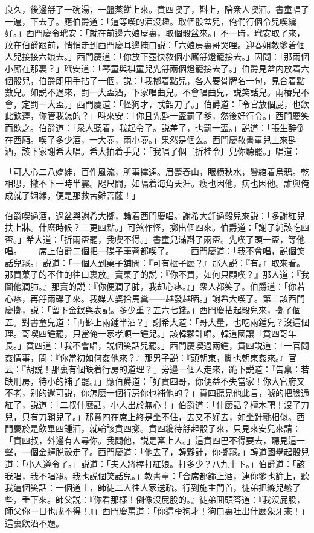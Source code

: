 良久，後邊㧱了一碗湯，一盤蒸餅上來。賁四喫了，斟上，陪衆人喫酒。書童唱了一遍，下去了。應伯爵道：「這等喫的酒沒趣。取個骰盆兒，俺們行個令兒喫纔好。」西門慶令玳安：「就在前邊六娘屋裏，取個骰盆來。」不一時，玳安取了來，放在伯爵跟前，悄悄走到西門慶耳邊掩口説：「六娘房裏哥哭哩。迎春姐教爹着個人兒接接六娘去。」西門慶道：「你放下壺快敎個小廝㧱燈籠接去。」因問：「那兩個小廝在那裏？」玳安道：「琴童與棋童兒先㧱兩個燈籠接去了。」伯爵見盆内放着六個骰兒，伯爵即用手拈了一個，説：「我擲着點兒，各人要骨牌名一句，見合着點數兒。如説不過來，罰一大盃酒，下家唱曲兒。不會唱曲兒，説笑話兒。兩樁兒不會，定罰一大盃。」西門慶道：「怪狗才，忒韶刀了。」伯爵道：「令官放個屁，也欽此欽遵，你管我怎的？」呌來安：「你且先斟一盃罰了爹，然後好行令。」西門慶笑而飲之。伯爵道：「衆人聽着，我起令了。説差了，也罰一盃。」説道：「張生醉倒在西廂。喫了多少酒，一大壺，兩小壺。」果然是個么。西門慶敎書童兒上來斟酒，該下家謝希大唱。希大拍着手兒：「我唱了個〔折桂令〕兒你聽罷。」唱道：

\begin{myquote}
「可人心二八嬌娃，百件風流，所事撑達。眉蹙春山，眼横秋水，鬢綰着烏鴉。乾相思，撇不下一時半霎。咫尺間，如隔着海角天涯。瘦也因他，病也因他。誰與俺成就了姻緣，便是那救苦難菩薩！」
\end{myquote}

伯爵喫過酒，過盆與謝希大擲，輪着西門慶唱。謝希大㧱過骰兒來説：「多謝紅兒扶上牀。什麽時候？三更四點。」可煞作怪，擲出個四來。伯爵道：「謝子純該吃四盃。」希大道：「折兩盃罷，我喫不得。」書童兒滿斟了兩盃。先喫了頭一盃，等他唱。——席上伯爵二個把一碟子荸薺都喫了。——西門慶道：「我不會唱，説個笑話兒罷。」説道：「一個人到菓子舖問：『可有榧子麽？』那人説：『有。』取來看。那買菓子的不住的往口裏放。賣菓子的説：『你不買，如何只顧喫？』那人道：『我圖他潤肺。』那賣的説：『你便潤了肺，我却心疼。』」衆人都笑了。伯爵道：「你若心疼，再㧱兩碟子來。我媒人婆拾馬糞——越發越晒。」謝希大喫了。第三該西門慶擲，説：「留下金釵與表記。多少重？五六七錢。」西門慶拈起骰兒來，擲了個五。對書童兒道：「再斟上兩鍾半酒？」謝希大道：「哥大量，也吃兩鍾兒？沒這個理。哥喫四鍾罷，只當俺一家孝順一鍾兒。」該韓夥計唱。韓道國讓「賁四哥年長。」賁四道：「我不會唱，説個笑話兒罷。」西門慶喫過兩鍾，賁四説道：「一官問姦情事，問：『你當初如何姦他來？』那男子説：『頭朝東，脚也朝東姦來。』官云：『胡説！那裏有個缺着行房的道理？』旁邊一個人走來，跪下説道：『告禀：若缺刑房，待小的補了罷。』」應伯爵道：「好賁四哥，你便益不失當家！你大官府又不老，别的還可説，你怎麽一個行房你也補他的？」賁四聽見他此言，唬的把臉通紅了，説道：「二叔什麽話，小人出於無心！」伯爵道：「什麽話？檀木靶！沒了刀兒，只有刀鞘兒了。」那賁四在席上終是坐不住，去又不好去，如坐針氈相似。西門慶於是飲畢四鍾酒，就輪該賁四擲。賁四纔待㧱起骰子來，只見來安兒來請：「賁四叔，外邊有人尋你。我問他，説是窰上人。」這賁四巴不得要去，聽見這一聲，一個金蟬脱殼走了。西門慶道：「他去了，韓夥計，你擲罷。」韓道國擧起骰兒道：「小人遵令了。」説道：「夫人將棒打紅娘。打多少？八九十下。」伯爵道：「該我唱，我不唱罷。我也説個笑話兒。」教書童：「合席都篩上酒，連你爹也篩上，聽我這個笑話：一個道士，師徒二人往人家送疏。行到施主門首，徒弟把縧兒鬆了些，垂下來。師父説：『你看那樣！倒像沒屁股的。』徒弟囬頭答道：『我沒屁股，師父你一日也成不得！』」西門慶罵道：「你這歪狗才！狗口裏吐出什麽象牙來！」這裏飲酒不題。

